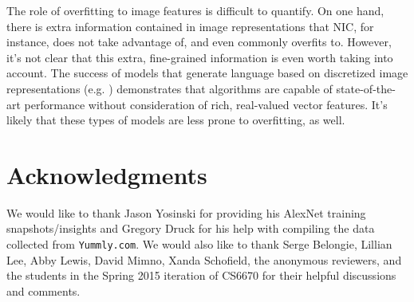 \documentclass[11pt]{article}
\begin{document}
The role of overfitting to image features is difficult to quantify. On
one hand, there is extra information contained in image
representations that NIC, for instance, does not take advantage of,
and even commonly overfits to. However, it's not clear that this
extra, fine-grained information is even worth taking into account. The
success of models that generate language based on discretized image
representations (e.g. \cite{young2014image}) demonstrates that
algorithms are capable of state-of-the-art performance without
consideration of rich, real-valued vector features. It's likely that
these types of models are less prone to overfitting, as well.
\section{Acknowledgments}

We would like to thank Jason Yosinski for providing his AlexNet
training snapshots/insights and Gregory Druck for his help with
compiling the data collected from \texttt{Yummly.com}. We would also
like to thank Serge Belongie, Lillian Lee, Abby Lewis, David Mimno,
Xanda Schofield, the anonymous reviewers, and the students in the
Spring 2015 iteration of CS6670 for their helpful discussions and
comments.

{\footnotesize
}
\end{document}
